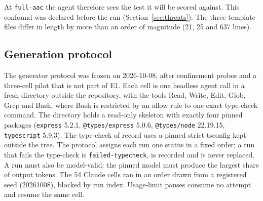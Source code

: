 \documentclass[10pt,a4paper]{article}
\newcommand{\lev}[1]{\texttt{\small #1}}
\begin{document}
At \lev{full-aac} the agent therefore sees the test it will be scored against. This confound was declared before
the run (Section~\ref{sec:threats}). %
The three template files differ in length by more than an order of magnitude (21, 25 and 637 lines).

\subsection{Generation protocol}

The generator protocol was frozen on 2026-10-08, after confinement probes and a three-cell pilot that is not part of
E1. %
Each cell is one headless agent call in a fresh directory outside the repository, with the tools Read, Write, Edit,
Glob, Grep and Bash, where Bash is restricted by an allow rule to one exact type-check command.
The directory holds a read-only skeleton with exactly four pinned packages (\texttt{express} 5.2.1,
\texttt{@types/express} 5.0.6, \texttt{@types/node} 22.19.15, \texttt{typescript} 5.9.3).
The type-check of record uses a pinned strict tsconfig kept outside the tree. %
The protocol assigns each run one status in a fixed order; a run that fails the type-check is
\texttt{failed-typecheck}, is recorded and is never replaced. %
A run must also be model-valid: the pinned model must produce the largest share of output tokens.
The 54 Claude cells ran in an order drawn from a registered seed (20261008), blocked by run index.
Usage-limit pauses consume no attempt and resume the same cell. %
\end{document}
